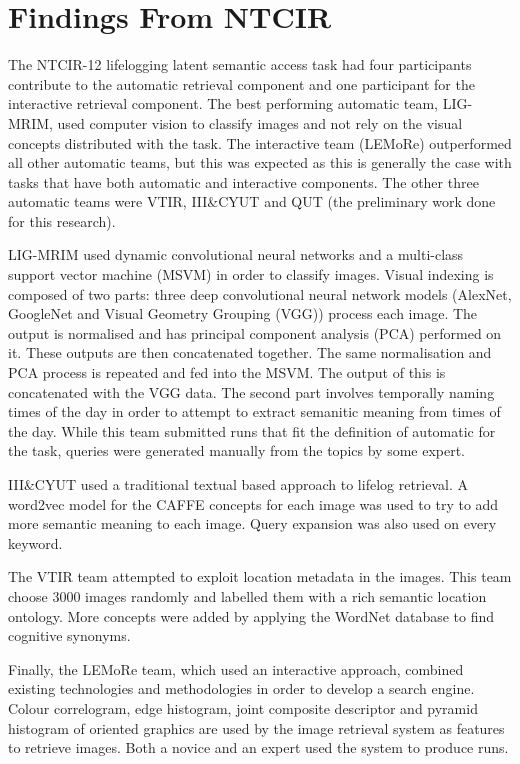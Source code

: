 \documentclass[12pt,a4paper]{article}
\begin{document}
\section{Findings From NTCIR}

The NTCIR-12 lifelogging latent semantic access task had four participants contribute to the automatic retrieval component and one participant for the interactive retrieval component. The best performing automatic team, LIG-MRIM, used computer vision to classify images and not rely on the visual concepts distributed with the task. The interactive team (LEMoRe) outperformed all other automatic teams, but this was expected as this is generally the case with tasks that have both automatic and interactive components. The other three automatic teams were VTIR, III\&CYUT and QUT (the preliminary work done for this research).

LIG-MRIM used dynamic convolutional neural networks and a multi-class support vector machine (MSVM) in order to classify images. Visual indexing is composed of two parts: three deep convolutional neural network models (AlexNet, GoogleNet and Visual Geometry Grouping (VGG)) process each image. The output is normalised and has principal component analysis (PCA) performed on it. These outputs are then concatenated together. The same normalisation and PCA process is repeated and fed into the MSVM. The output of this is concatenated with the VGG data. The second part involves temporally naming times of the day in order to attempt to extract semanitic meaning from times of the day. While this team submitted runs that fit the definition of automatic for the task, queries were generated manually from the topics by some expert.

III\&CYUT used a traditional textual based approach to lifelog retrieval. A word2vec model for the CAFFE concepts for each image was used to try to add more semantic meaning to each image. Query expansion was also used on every keyword.

The VTIR team attempted to exploit location metadata in the images. This team choose 3000 images randomly and labelled them with a rich semantic location ontology. More concepts were added by applying the WordNet database to find cognitive synonyms.

Finally, the LEMoRe team, which used an interactive approach, combined existing technologies and methodologies in order to develop a search engine. Colour correlogram, edge histogram, joint composite descriptor and pyramid histogram of oriented graphics are used by the image retrieval system as features to retrieve images. Both a novice and an expert used the system to produce runs.
\end{document}
